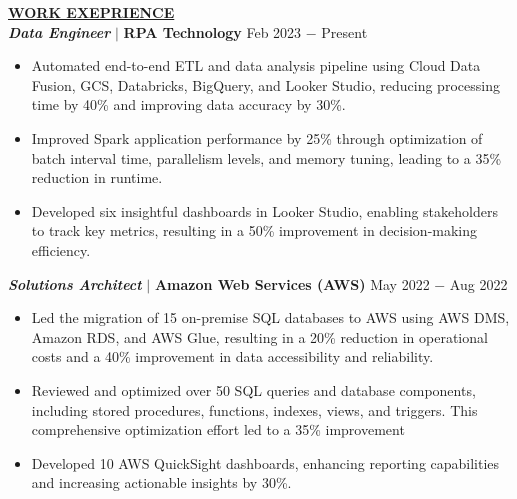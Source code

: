 \documentclass{article}
\begin{document}
% 
%
\noindent \textbf{\underline{WORK EXEPRIENCE}} \\
\noindent \textit{\textbf{Data Engineer}} $\mid$ \textbf{RPA Technology} 
\hfill Feb 2023 $-$ Present
\begin{itemize}[noitemsep,nolistsep,leftmargin=*]
\item {Automated end-to-end ETL and data analysis pipeline using Cloud Data Fusion, GCS, Databricks, BigQuery, and Looker Studio, reducing processing time by 40\% and improving data accuracy by 30\%.}
\item {Improved Spark application performance by 25\% through optimization of batch interval time, parallelism levels, and memory tuning, leading to a 35\% reduction in runtime.}
\item {Developed six insightful dashboards in Looker Studio, enabling stakeholders to track key metrics, resulting in a 50\% improvement in decision-making efficiency. }


\end{itemize}

\noindent \textit{\textbf{Solutions Architect}} $\mid$ \textbf{Amazon Web Services (AWS)}  
 \hfill May 2022 $-$ Aug 2022
\begin{itemize}[noitemsep,nolistsep,leftmargin=*]
\item {Led the migration of 15 on-premise SQL databases to AWS using AWS DMS, Amazon RDS, and AWS Glue, resulting in a 20\% reduction in operational costs and a 40\% improvement in data accessibility and reliability.}
\item {Reviewed and optimized over 50 SQL queries and database components, including stored procedures, functions, indexes, views, and triggers. This comprehensive optimization effort led to a 35\% improvement}
\item {Developed 10 AWS QuickSight dashboards, enhancing reporting capabilities and increasing actionable insights by 30\%.}
\end{itemize}
\end{document}

